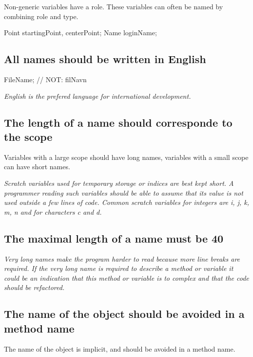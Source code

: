 \documentclass[a4paper,11pt,oneside]{scrbook}
\newcommand{\guideline}[1]{{\subsection{#1}}}
\newcommand{\motivation}[1]{{\normalfont \itshape #1}}
\begin{document}
Non-generic variables have a role. These variables can often be named by
combining role and type.

\begin{code}
  Point startingPoint, centerPoint;
  Name loginName;
\end{code}

\guideline{All names should be written in English}

\begin{code}
  FileName;     // NOT: filNavn 
\end{code}

\motivation{
  English is the prefered language for international development.
}

\guideline{The length of a name should corresponde to the scope}

Variables with a large scope should have long names, variables with a small
scope can have short names.

\motivation{ 
  Scratch variables used for temporary storage or indices are best kept short. A
  programmer reading such variables should be able to assume that its value is
  not used outside a few lines of code. Common scratch variables for integers
  are i, j, k, m, n and for characters c and d.
}

\guideline{The maximal length of a name must be 40}

\motivation{ 
  Very long names make the program harder to read because more line breaks are
  required. If the very long name is required to describe a method or variable
  it could be an indication that this method or variable is to complex and that
  the code should be refactored.
}

\guideline{The name of the object should be avoided in a method name}

The name of the object is implicit, and should be avoided in a method name. 
\end{document}
